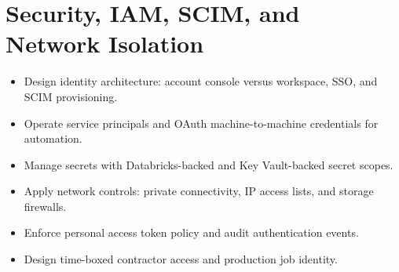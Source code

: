 \chapter{Security, IAM, SCIM, and Network Isolation}
%
%
\begin{objectives}
\begin{itemize}
    \item Design identity architecture: account console versus workspace, SSO, and SCIM provisioning.
    \item Operate service principals and OAuth machine-to-machine credentials for automation.
    \item Manage secrets with Databricks-backed and Key Vault-backed secret scopes.
    \item Apply network controls: private connectivity, IP access lists, and storage firewalls.
    \item Enforce personal access token policy and audit authentication events.
    \item Design time-boxed contractor access and production job identity.
\end{itemize}
\end{objectives}

